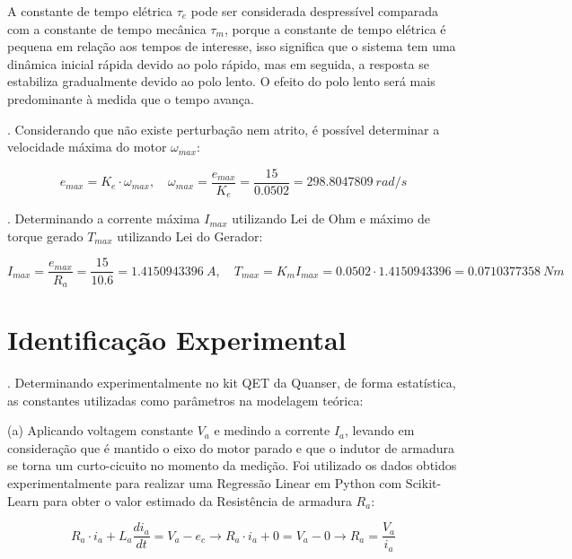 \documentclass[10pt]{article}
\begin{document}
\quad A constante de tempo elétrica $\tau_e$ pode ser considerada despressível
comparada com a constante de tempo mecânica $\tau_m$,
porque a constante de tempo elétrica é pequena em relação aos tempos de interesse,
isso significa que o sistema tem uma dinâmica inicial rápida devido ao polo rápido,
mas em seguida, a resposta se estabiliza gradualmente devido ao polo lento.
O efeito do polo lento será mais predominante à medida que o tempo avança.

. Considerando que não existe perturbação nem atrito,
é possível determinar a velocidade máxima do motor $\omega_{max}$:

\begin{equation}
    e_{max} = K_e \cdot \omega_{max},
    \quad \omega_{max} = \frac{e_{max}}{K_e} = \frac{15}{0.0502} = 298.8047809 \ rad/s
\end{equation}

. Determinando a corrente máxima $I_{max}$ utilizando Lei de Ohm e máximo de torque gerado $T_{max}$ utilizando Lei do Gerador:

\begin{equation}
    I_{max} = \frac{e_{max}}{R_a} = \frac{15}{10.6} = 1.4150943396 \ A, \quad T_{max} = K_m I_{max} = 0.0502 \cdot 1.4150943396 = 0.0710377358 \ Nm
\end{equation}

\section{Identificação Experimental}

. Determinando experimentalmente no kit QET da Quanser, de forma estatística,
as constantes utilizadas como parâmetros na modelagem teórica:

\quad (a) Aplicando voltagem constante $V_a$ e medindo a corrente $I_a$,
levando em consideração que é mantido o eixo do motor parado
e que o indutor de armadura se torna um curto-cicuito no momento da medição.
Foi utilizado os dados obtidos experimentalmente para realizar uma Regressão Linear em Python com Scikit-Learn
para obter o valor estimado da Resistência de armadura $R_a$:

\begin{equation}
    R_a \cdot i_a + L_a \frac{di_a}{dt} = V_a - e_c \rightarrow R_a \cdot i_a + 0 = V_a - 0 \rightarrow R_a = \frac{V_a}{i_a}
\end{equation}
\end{document}
